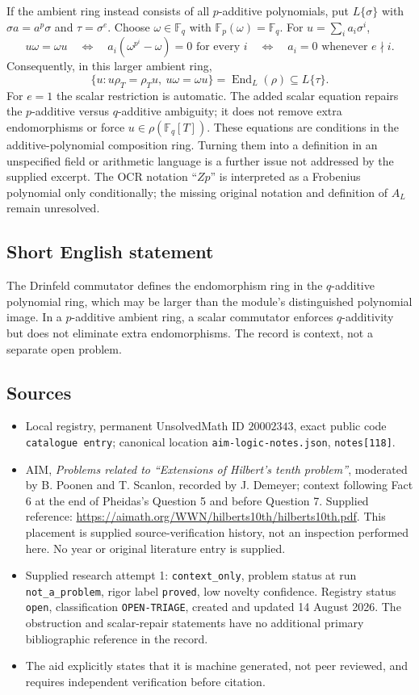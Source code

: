 \documentclass[11pt]{article}
\newcommand{\F}{\mathbb{F}}
\begin{document}
If the ambient ring instead consists of all \(p\)-additive polynomials, put \(L\{\sigma\}\) with \(\sigma a=a^p\sigma\) and \(\tau=\sigma^e\). Choose \(\omega\in\F_q\) with \(\F_p(\omega)=\F_q\). For \(u=\sum_i a_i\sigma^i\),
\[
 u\omega=\omega u
 \quad\Longleftrightarrow\quad
 a_i(\omega^{p^i}-\omega)=0\text{ for every }i
 \quad\Longleftrightarrow\quad
 a_i=0\text{ whenever }e\nmid i.
\]
Consequently, in this larger ambient ring,
\[
 \{u:u\rho_T=\rho_Tu,\ u\omega=\omega u\}
 =\operatorname{End}_L(\rho)\subseteq L\{\tau\}.
\]
For \(e=1\) the scalar restriction is automatic. The added scalar equation repairs the \(p\)-additive versus \(q\)-additive ambiguity; it does not remove extra endomorphisms or force \(u\in\rho(\F_q[T])\). These equations are conditions in the additive-polynomial composition ring. Turning them into a definition in an unspecified field or arithmetic language is a further issue not addressed by the supplied excerpt. The OCR notation ``\(Zp\)'' is interpreted as a Frobenius polynomial only conditionally; the missing original notation and definition of \(A_L\) remain unresolved.
\subsection{Short English statement}
The Drinfeld commutator defines the endomorphism ring in the \(q\)-additive polynomial ring, which may be larger than the module's distinguished polynomial image. In a \(p\)-additive ambient ring, a scalar commutator enforces \(q\)-additivity but does not eliminate extra endomorphisms. The record is context, not a separate open problem.
\subsection{Sources}
\begin{itemize}
\item Local registry, permanent UnsolvedMath ID \(20002343\), exact public code \texttt{catalogue entry}; canonical location \texttt{aim-logic-notes.json}, \texttt{notes[118]}.
\item AIM, \emph{Problems related to ``Extensions of Hilbert's tenth problem''}, moderated by B. Poonen and T. Scanlon, recorded by J. Demeyer; context following Fact 6 at the end of Pheidas's Question 5 and before Question 7. Supplied reference: \url{https://aimath.org/WWN/hilberts10th/hilberts10th.pdf}. This placement is supplied source-verification history, not an inspection performed here. No year or original literature entry is supplied.
\item Supplied research attempt 1: \texttt{context\_only}, problem status at run \texttt{not\_a\_problem}, rigor label \texttt{proved}, low novelty confidence. Registry status \texttt{open}, classification \texttt{OPEN-TRIAGE}, created and updated 14 August 2026. The obstruction and scalar-repair statements have no additional primary bibliographic reference in the record.
\item The aid explicitly states that it is machine generated, not peer reviewed, and requires independent verification before citation.
\end{itemize}
\end{document}
